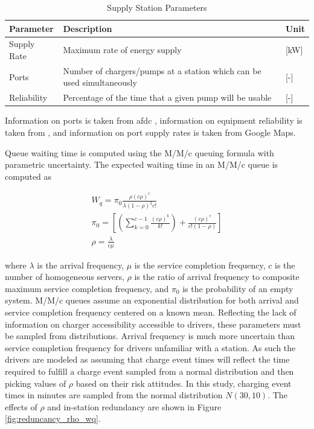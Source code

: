 \begin{table}[H]
	\centering
	\caption{Supply Station Parameters}
	\label{tab:param_supply}
	\begin{tabular}{|C{/8}|C{/8}|C{/8}|}
		\hline {} Parameter & Description & Unit \\
		\hline Supply Rate & Maximum rate of energy supply & [kW] \\
		\hline Ports & Number of chargers/pumps at a station which can be used simultaneously & [-] \\
		\hline Reliability & Percentage of the time that a given pump will be usable & [-] \\ 
		\hline
	\end{tabular}
\end{table}

Information on ports is taken from \gls{afdc} \cite{afdc_2023}, information on equipment reliability is taken from \cite{Rempel_2023}, and information on port supply rates is taken from Google Maps.

Queue waiting time is computed using the M/M/c queuing formula with parametric uncertainty. The expected waiting time in an M/M/c queue is computed as

\begin{gather}
	W_q = \pi_0\frac{\rho(c\rho)^c}{\lambda(1-\rho)^2c!}\\
	\pi_0=\left[\left(\sum_{k = 0}^{c - 1}\frac{(c\rho)^k}{k!}\right) + \frac{(c\rho)^c}{c!(1 - \rho)}\right]\\
	\rho = \frac{\lambda}{c\mu}
\end{gather}

where $\lambda$ is the arrival frequency, $\mu$ is the service completion frequency, $c$ is the number of homogeneous servers, $\rho$ is the ratio of arrival frequency to composite maximum service completion frequency, and $\pi_0$ is the probability of an empty system. M/M/c queues assume an exponential distribution for both arrival and service completion frequency centered on a known mean. Reflecting the lack of information on charger accessibility accessible to drivers, these parameters must be sampled from distributions. Arrival frequency is much more uncertain than service completion frequency for drivers unfamiliar with a station. As such the drivers are modeled as assuming that charge event times will reflect the time required to fulfill a charge event sampled from a normal distribution and then picking values of $\rho$ based on their risk attitudes. In this study, charging event times in minutes are sampled from the normal distribution $N(30, 10)$. The effects of $\rho$ and in-station redundancy are shown in Figure \ref{fig:reduncancy_rho_wq}.

